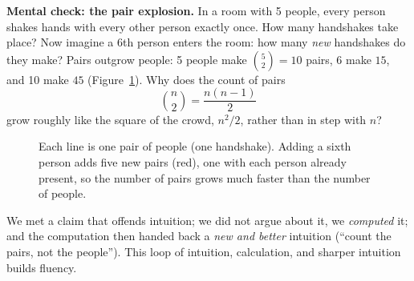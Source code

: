 \begin{recoverybox}
\textbf{Mental check: the pair explosion.} In a room with 5 people, every person shakes hands with every other person exactly once. How many handshakes take place? Now imagine a 6th person enters the room: how many \emph{new} handshakes do they make? Pairs outgrow people: 5 people make $\binom{5}{2} = 10$ pairs, 6 make $15$, and 10 make $45$ (Figure~\ref{ch00:handshakes}). Why does the count of pairs
\[
  \binom{n}{2} = \frac{n(n-1)}{2}
\]
grow roughly like the square of the crowd, $n^2/2$, rather than in step with $n$?
\end{recoverybox}

\begin{figure}[htbp]
\centering
{}
\caption{Each line is one pair of people (one handshake). Adding a sixth
person adds five new pairs (red), one with each person already present, so the
number of pairs grows much faster than the number of people.}
\label{ch00:handshakes}
\end{figure}

\begin{whybox}
We met a
claim that offends intuition; we did not argue about it, we \emph{computed} it;
and the computation then handed back a \emph{new and better} intuition (``count
the pairs, not the people''). This loop of intuition, calculation, and sharper intuition builds fluency.
\end{whybox}

